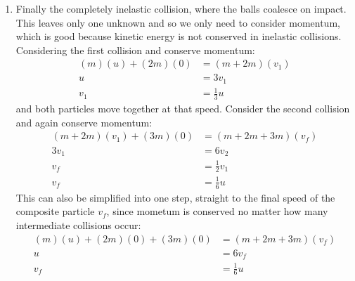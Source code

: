 \begin{hint}[A1969AMIIQ8l]
{\begin{enumerate}
As before, repeating the process for the second collision gives two equations:
\begin{align*} 2v_{2} &= 2w_{2} + 3w_{3} \\ 2v_{2}^{2} &= 2w_{2}^{2} + 3w_{3}^{2} \end{align*}
with solution for after the collision of $w_{2} = - \frac{1}{5} v_{2} = - \frac{2}{15} u$ and $w_{3} = \frac{4}{5} v_{2} = \frac{8}{15} u$. Thus the final speeds after the second collision are:
\begin{align*} v_{1} = - \frac{1}{3}u && w_{2} = - \frac{2}{15}u && w_{3} = \frac{8}{15}u \end{align*}
	\item Finally the completely inelastic collision, where the balls coalesce on impact. This leaves only one unknown and so we only need to consider momentum, which is good because kinetic energy is not conserved in inelastic collisions.
Considering the first collision and conserve momentum:
\begin{align*} (m)(u) + (2m)(0) &= (m + 2m)(v_{1}) \\ u &= 3v_{1} \\ v_{1} &= \frac{1}{3}u \end{align*} and both particles move together at that speed.
Consider the second collision and again conserve momentum:
\begin{align*} (m + 2m)(v_{1}) + (3m)(0) &= (m + 2m + 3m)(v_{f}) \\ 3v_{1} &= 6v_{2} \\ v_{f} &= \frac{1}{2} v_{1} \\ v_{f} &= \frac{1}{6} u \end{align*}
This can also be simplified into one step, straight to the final speed of the composite particle $v_{f}$, since mometum is conserved no matter how many intermediate collisions occur:
\begin{align*} (m)(u) + (2m)(0) + (3m)(0) &= (m + 2m + 3m)(v_{f}) \\ u &= 6 v_{f} \\ v_{f} &= \frac{1}{6} u \end{align*}
\end{enumerate}

}
\end{hint}